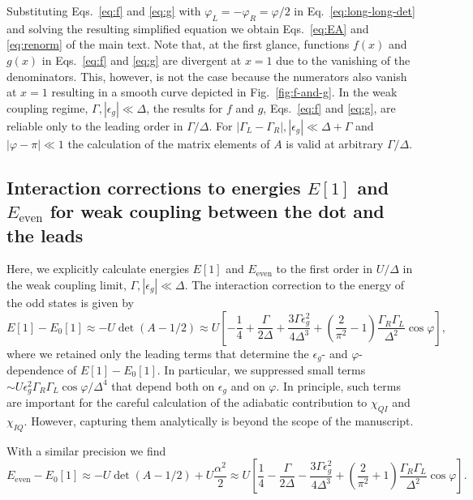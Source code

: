 \documentclass[aps,reprint,longbibliography, prb]{revtex4-2}
\begin{document}
Substituting Eqs.~\eqref{eq:f} and \eqref{eq:g} with $\varphi_L = -\varphi_R = \varphi/2$ in Eq.~\eqref{eq:long-long-det} and solving the resulting simplified equation we obtain Eqs.~\eqref{eq:EA} and \eqref{eq:renorm} of the main text. Note that, at the first glance, functions $f(x)$ and $g(x)$ in Eqs.~\eqref{eq:f} and \eqref{eq:g} are divergent at $x = 1$ due to the vanishing of the denominators. This, however, is not the case because the numerators also vanish at $x = 1$ resulting in a smooth curve depicted in Fig.~\ref{fig:f-and-g}. In the weak coupling regime, $\Gamma,|\epsilon_g|\ll\Delta$, the results for $f$ and $g$, Eqs.~\eqref{eq:f} and \eqref{eq:g}, are reliable only to the leading order in $\Gamma / \Delta$. For $|\Gamma_L - \Gamma_R|,|\epsilon_g|\ll\Delta + \Gamma$ and $|\varphi-\pi|\ll 1$ the calculation of the matrix elements of $A$ is valid at arbitrary $\Gamma/\Delta$.

\subsection{Interaction corrections to energies $E[1]$ and $E_\mathrm{even}$ for weak coupling between the dot and the leads}
\label{app:int-weak-coup}
Here, we explicitly calculate energies $E[1]$ and $E_\mathrm{even}$ to the first order in $U / \Delta$ in the weak coupling limit, $\Gamma, |\epsilon_g| \ll \Delta$. The interaction correction to the energy of the odd states is given by
\begin{equation}
    \label{eq:odd-weak-coup}
    E[1] - E_0[1] \approx - U \det(A - 1/2)  \approx U\left[-\frac{1}{4}+\frac{\Gamma}{2\Delta} + \frac{3\Gamma\epsilon_g^2}{4\Delta^3}+\left(\frac{2}{\pi^2}-1\right)\frac{\Gamma_R\Gamma_L}{\Delta^2} \cos\varphi\right],
\end{equation}
where we retained only the leading terms that determine the $\epsilon_g$- and $\varphi$- dependence of $E[1] - E_0[1]$. In particular, we suppressed small terms $\sim U\epsilon_g^2 \Gamma_R\Gamma_L\cos\varphi/\Delta^4$ that depend both on $\epsilon_g$ and on $\varphi$. In principle, such terms are important for the careful calculation of the adiabatic contribution to $\chi_{QI}$ and $\chi_{IQ}$. However, capturing them analytically is beyond the scope of the manuscript.

With a similar precision we find
\begin{equation}
    \label{eq:even-weak-coup}
    E_\mathrm{even} - E_0[1] \approx - U \det(A - 1/2) + U\frac{\alpha^2}{2} \approx U\left[\frac{1}{4}-\frac{\Gamma}{2\Delta} - \frac{3\Gamma\epsilon_g^2}{4\Delta^3}+\left(\frac{2}{\pi^2}+1\right)\frac{\Gamma_R\Gamma_L}{\Delta^2} \cos\varphi\right].
\end{equation}
\end{document}
